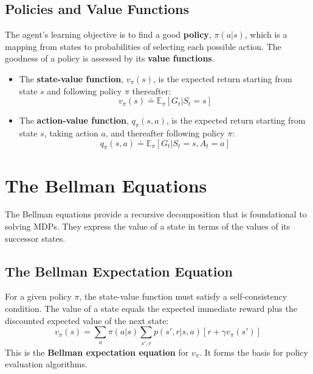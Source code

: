 \subsection{Policies and Value Functions}
The agent's learning objective is to find a good \textbf{policy}, $\pi(a|s)$, which is a mapping from states to probabilities of selecting each possible action. The goodness of a policy is assessed by its \textbf{value functions}.
\begin{itemize}
    \item The \textbf{state-value function}, $v_\pi(s)$, is the expected return starting from state $s$ and following policy $\pi$ thereafter:
    \begin{equation}
        v_\pi(s) \doteq \mathbb{E}_\pi [G_t | S_t=s]
    \end{equation}
    \item The \textbf{action-value function}, $q_\pi(s, a)$, is the expected return starting from state $s$, taking action $a$, and thereafter following policy $\pi$:
    \begin{equation}
        q_\pi(s, a) \doteq \mathbb{E}_\pi [G_t | S_t=s, A_t=a]
    \end{equation}
\end{itemize}

\section{The Bellman Equations}
The Bellman equations provide a recursive decomposition that is foundational to solving MDPs. They express the value of a state in terms of the values of its successor states.

\subsection{The Bellman Expectation Equation}
For a given policy $\pi$, the state-value function must satisfy a self-consistency condition. The value of a state equals the expected immediate reward plus the discounted expected value of the next state:
\begin{equation}
    v_\pi(s) = \sum_a \pi(a|s) \sum_{s', r} p(s', r | s, a) [r + \gamma v_\pi(s')]
\end{equation}
This is the \textbf{Bellman expectation equation} for $v_\pi$. It forms the basis for policy evaluation algorithms.

